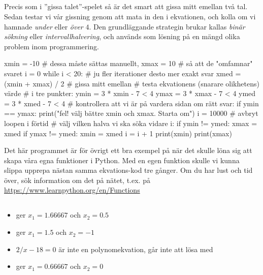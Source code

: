 \subsection*{}
Precis som i ''gissa talet''-spelet så är det smart att gissa mitt emellan två tal. Sedan testar vi vår gissning  genom att mata in den i ekvationen, och kolla om vi hamnade \emph{under} eller \emph{över} $4$. Den grundläggande strategin brukar kallas \emph{binär sökning} eller \emph{intervallhalvering}, och används som lösning på en mängd olika problem inom programmering.
\vspace{10pt}
\begin{python}
xmin = -10 # dessa måste sättas manuellt,
xmax = 10 # så att de "omfamnar" svaret
i = 0
while i < 20: # ju fler iterationer desto mer exakt svar
	xmed = (xmin + xmax) / 2 # gissa mitt emellan
	# testa ekvationens (snarare olikhetens) värde
	# i tre punkter:
	ymin = 3 * xmin - 7 < 4
	ymax = 3 * xmax - 7 < 4
	ymed = 3 * xmed - 7 < 4
	# kontrollera att vi är på vardera sidan om rätt svar:
	if ymin == ymax:
		print("fel! välj bättre xmin och xmax. Starta om")
		i = 10000 # avbryt loopen i förtid
	# välj vilken halva vi ska söka vidare i:
	if ymin != ymed:
		xmax = xmed
	if ymax != ymed:
		xmin = xmed
	i = i + 1
print(xmin)
print(xmax)
\end{python}
Det här programmet är för övrigt ett bra exempel på när det skulle löna sig att skapa våra egna funktioner i Python. Med en egen funktion skulle vi kunna slippa upprepa nästan samma ekvations-kod tre gånger. Om du har lust och tid över, sök information om det på nätet, t.ex. på \url{https://www.learnpython.org/en/Functions}


\subsection*{}
\begin{itemize}
\item {} ger $x_{1}=1.66667$ och $x_{2}=0.5$
\item {} ger $x_{1}=1.5$ och $x_{2}=-1$
\item $2/x - 18 = 0$ är inte en polynomekvation, går inte att lösa med 
\item {} ger $x_{1}=0.66667$ och $x_{2}=0$
\end{itemize}

